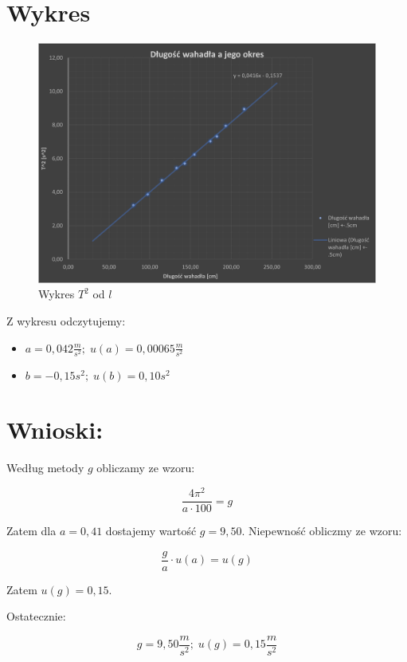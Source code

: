 \documentclass[a4paper,12pt]{article}
\begin{document}
\section{Wykres}

\begin{figure}[h]
	\centering
	\includegraphics[width=\linewidth, keepaspectratio]{Wykres.png}
	\caption{Wykres $T^2$ od $l$}
\end{figure}

Z wykresu odczytujemy:

\begin{itemize}
	\item $a = 0,042 \frac{m}{s^2};\; u\left(a\right) = 0,00065 \frac{m}{s^2}$
	\item $b = -0,15 s^2;\; u\left(b\right) = 0,10 s^2$
\end{itemize}

\section{Wnioski:}

Według metody $g$ obliczamy ze wzoru:

\[ \frac{4\pi^2}{a \cdot 100} = g \]

Zatem dla $a = 0,41$ dostajemy wartość $g = 9,50$. Niepewność obliczmy ze wzoru:

\[ \frac{g}{a} \cdot u\left(a\right) = u\left(g\right) \]

Zatem $u\left(g\right) = 0,15$.

Ostatecznie:

\[ g = 9,50 \frac{m}{s^2};\;  u\left(g\right) = 0,15 \frac{m}{s^2} \]
\end{document}
